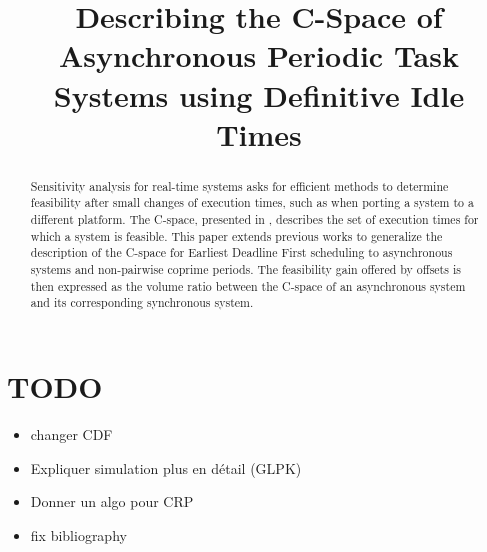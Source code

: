 \documentclass[conference]{IEEEtran}
\begin{document}
\title{Describing the C-Space of Asynchronous Periodic Task Systems using
Definitive Idle Times}


\author{
\and
{}
}
\maketitle

\begin{abstract}
Sensitivity analysis for real-time systems asks for efficient methods to determine feasibility
after small changes of execution times, such as when porting a system to a different platform.
The C-space, presented in \cite{bini2004schedulability,george2009characterization}, describes the
set of execution times for which a system is feasible. This paper extends previous works to
generalize the description of the C-space for Earliest Deadline First scheduling to asynchronous
systems and non-pairwise coprime periods. The feasibility gain offered by offsets is then
expressed as the volume ratio between the C-space of an asynchronous system and its corresponding
synchronous system.
\end{abstract}

%


\section*{TODO}

\begin{itemize}
	\item changer CDF
	\item Expliquer simulation plus en d\'etail (GLPK)
	\item Donner un algo pour CRP
	\item fix bibliography
\end{itemize}
\end{document}
